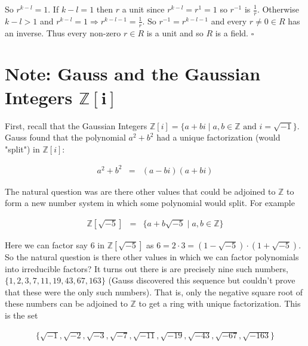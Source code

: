 \documentclass[11pt, oneside]{article}   	%
\theoremstyle{definition}
\begin{document}
\bigskip
\noindent
So $ r^{k-l} = 1 $. If $k-l = 1$ then $r$ a unit since $r^{k-l} = r^{1} = 1$ so $r^{-1}$ is $\frac{1}{r}$. Otherwise
$k-l > 1$ and $r^{k-l} = 1 \Rightarrow r^{k-l-1} = \frac{1}{r}$.   So $r^{-1} = r^{k-l -1}$ and 
every $r \neq 0 \in R$ has an inverse. Thus every non-zero  $r \in R$ is a unit and so $R$ is a field. $\square$


\section{Note: Gauss and the Gaussian Integers $\boldsymbol{\mathbb{Z}[i]}$}
First, recall that the Gaussian Integers  $\mathbb{Z}[i] = \{a + bi \mid  a,b \in \mathbb{Z} \text{ and } i = \sqrt{-1} \}$. 
Gauss found that the polynomial $a^2 + b^2$ had a unique factorization (would "split") in $\mathbb{Z}[i]$: 


\begin{equation*}
\begin{array}{rlll} 
a^2 + b^2 
&=&  (a - bi)(a + bi)
\end{array}
\end{equation*}

\bigskip
\noindent
The natural question was are there other values that could be adjoined to $\mathbb{Z}$ to form a new number 
system in which some polynomial would split. For example

\begin{equation*}
\begin{array}{rlll} 
\mathbb{Z}[\sqrt{-5}]
&=& \{a+b\sqrt{-5}  \mid a,b \in \mathbb{Z}\}
\end{array}
\end{equation*}

\bigskip
\noindent 
Here we can factor say $6$ in $\mathbb{Z}[\sqrt{-5}]$ as $6 = 2 \cdot 3 = (1 - \sqrt{-5}) \cdot (1 + \sqrt{-5})$. So the natural question
is there other values in which we can factor polynomials into irreducible factors? It turns out there 
is are precisely nine such numbers, $\{1,2,3,7,11,19,43,67,163\}$ (Gauss discovered this sequence but couldn't prove that these were 
the only such numbers). That is, only the negative square root of these numbers can be adjoined to  $\mathbb{Z}$ to get a ring with 
unique factorization. This is the set

\begin{equation*}
\begin{array}{rlll} 
\{\sqrt{-1}, \sqrt{-2}, \sqrt{-3},  \sqrt{-7}, \sqrt{-11}, \sqrt{-19}, \sqrt{-43}, \sqrt{-67}, \sqrt{-163}\}
\end{array}
\end{equation*}
\end{document}

